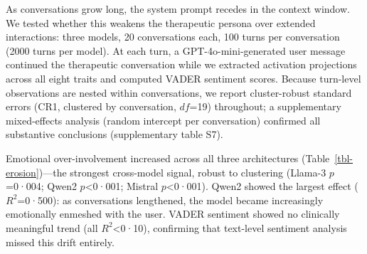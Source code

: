 \documentclass[
  10pt,
  a4paper,
  onecolumn]{article}
\begin{document}
As conversations grow long, the system prompt recedes in the context
window. We tested whether this weakens the therapeutic persona over
extended interactions: three models, 20 conversations each, 100 turns
per conversation (2000 turns per model). At each turn, a
GPT-4o-mini-generated user message continued the therapeutic
conversation while we extracted activation projections across all eight
traits and computed VADER sentiment scores. Because turn-level
observations are nested within conversations, we report cluster-robust
standard errors (CR1, clustered by conversation, \(df\)=19) throughout;
a supplementary mixed-effects analysis (random intercept per
conversation) confirmed all substantive conclusions (supplementary table
S7).

Emotional over-involvement increased across all three architectures
(Table~\ref{tbl-erosion})---the strongest cross-model signal, robust to
clustering (Llama-3 \(p\)=0·004; Qwen2 \(p\)\textless0·001; Mistral
\(p\)\textless0·001). Qwen2 showed the largest effect (\(R^2\)=0·500):
as conversations lengthened, the model became increasingly emotionally
enmeshed with the user. VADER sentiment showed no clinically meaningful
trend (all \(R^2\)\textless0·10), confirming that text-level sentiment
analysis missed this drift entirely.
\end{document}
